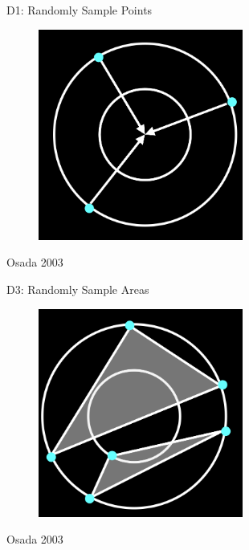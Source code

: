 \documentclass{beamer}
\begin{document}
\begin{frame}{D1: Randomly Sample Points}

\begin{figure}[t]
	\centering
    \includegraphics[width=0.6\textwidth]{D1.png}
\end{figure}

\small Osada 2003

\end{frame}

\begin{frame}{D3: Randomly Sample Areas}

\begin{figure}[t]
	\centering
    \includegraphics[width=0.6\textwidth]{D3.png}
\end{figure}

\small Osada 2003

\end{frame}
\end{document}
